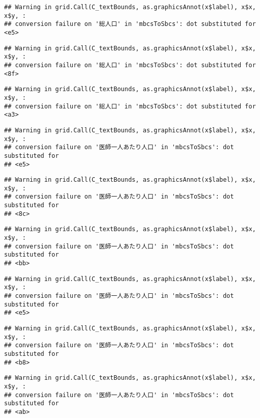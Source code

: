 \documentclass[
]{article}
\begin{document}
\begin{verbatim}
## Warning in grid.Call(C_textBounds, as.graphicsAnnot(x$label), x$x, x$y, :
## conversion failure on '総人口' in 'mbcsToSbcs': dot substituted for <e5>
\end{verbatim}

\begin{verbatim}
## Warning in grid.Call(C_textBounds, as.graphicsAnnot(x$label), x$x, x$y, :
## conversion failure on '総人口' in 'mbcsToSbcs': dot substituted for <8f>
\end{verbatim}

\begin{verbatim}
## Warning in grid.Call(C_textBounds, as.graphicsAnnot(x$label), x$x, x$y, :
## conversion failure on '総人口' in 'mbcsToSbcs': dot substituted for <a3>
\end{verbatim}

\begin{verbatim}
## Warning in grid.Call(C_textBounds, as.graphicsAnnot(x$label), x$x, x$y, :
## conversion failure on '医師一人あたり人口' in 'mbcsToSbcs': dot substituted for
## <e5>
\end{verbatim}

\begin{verbatim}
## Warning in grid.Call(C_textBounds, as.graphicsAnnot(x$label), x$x, x$y, :
## conversion failure on '医師一人あたり人口' in 'mbcsToSbcs': dot substituted for
## <8c>
\end{verbatim}

\begin{verbatim}
## Warning in grid.Call(C_textBounds, as.graphicsAnnot(x$label), x$x, x$y, :
## conversion failure on '医師一人あたり人口' in 'mbcsToSbcs': dot substituted for
## <bb>
\end{verbatim}

\begin{verbatim}
## Warning in grid.Call(C_textBounds, as.graphicsAnnot(x$label), x$x, x$y, :
## conversion failure on '医師一人あたり人口' in 'mbcsToSbcs': dot substituted for
## <e5>
\end{verbatim}

\begin{verbatim}
## Warning in grid.Call(C_textBounds, as.graphicsAnnot(x$label), x$x, x$y, :
## conversion failure on '医師一人あたり人口' in 'mbcsToSbcs': dot substituted for
## <b8>
\end{verbatim}

\begin{verbatim}
## Warning in grid.Call(C_textBounds, as.graphicsAnnot(x$label), x$x, x$y, :
## conversion failure on '医師一人あたり人口' in 'mbcsToSbcs': dot substituted for
## <ab>
\end{verbatim}
\end{document}
